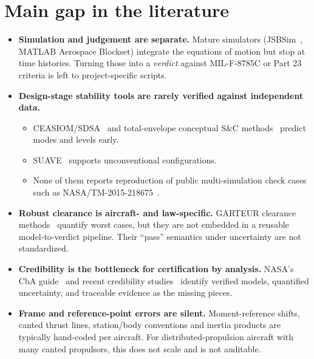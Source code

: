 \documentclass[11pt]{article}
\begin{document}
\section{Main gap in the literature}
\begin{itemize}
  \item \textbf{Simulation and judgement are separate.} Mature simulators
    (JSBSim~\citep{berndt2004}, MATLAB Aerospace Blockset) integrate the
    equations of motion but stop at time histories. Turning those into a
    \emph{verdict} against MIL-F-8785C or Part 23 criteria is left to
    project-specific scripts.
  \item \textbf{Design-stage stability tools are rarely verified against
    independent data.}
    \begin{itemize}
      \item CEASIOM/SDSA~\citep{rizzi2011simsac} and total-envelope
        conceptual S\&C methods~\citep{swann2015} predict modes and levels
        early.
      \item SUAVE~\citep{lukaczyk2015} supports unconventional
        configurations.
      \item None of them reports reproduction of public multi-simulation
        check cases such as NASA/TM-2015-218675~\citep{nesc2015}.
    \end{itemize}
  \item \textbf{Robust clearance is aircraft- and law-specific.} GARTEUR
    clearance methods~\citep{fielding2002} quantify worst cases, but they
    are not embedded in a reusable model-to-verdict pipeline. Their
    ``pass'' semantics under uncertainty are not standardized.
  \item \textbf{Credibility is the bottleneck for certification by
    analysis.} NASA's CbA guide~\citep{mauery2021} and recent credibility
    studies~\citep{favaro2025} identify verified models, quantified
    uncertainty, and traceable evidence as the missing pieces.
  \item \textbf{Frame and reference-point errors are silent.} Moment-reference
    shifts, canted thrust lines, station/body conventions and inertia
    products are typically hand-coded per aircraft. For distributed-propulsion
    aircraft with many canted propulsors, this does not scale and is not
    auditable.
\end{itemize}
\end{document}
